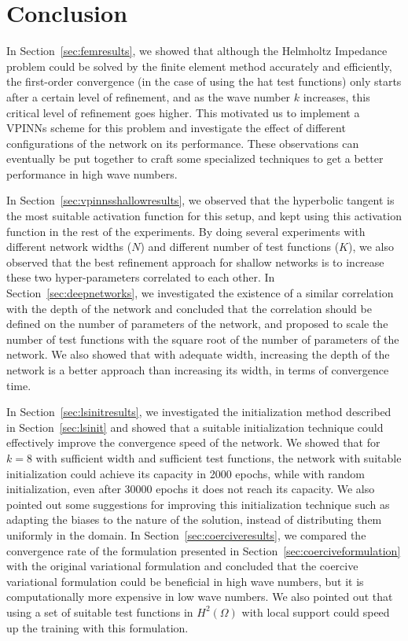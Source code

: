 \section{Conclusion}\label{sec:conclusion}
In Section~\ref{sec:femresults}, we showed that although the Helmholtz Impedance problem could be solved by the finite element method accurately and efficiently, the first-order convergence (in the case of using the hat test functions) only starts after a certain level of refinement, and as the wave number $k$ increases, this critical level of refinement goes higher. This motivated us to implement a VPINNs scheme for this problem and investigate the effect of different configurations of the network on its performance. These observations can eventually be put together to craft some specialized techniques to get a better performance in high wave numbers.

In Section~\ref{sec:vpinnsshallowresults}, we observed that the hyperbolic tangent is the most suitable activation function for this setup, and kept using this activation function in the rest of the experiments. By doing several experiments with different network widths ($N$) and different number of test functions ($K$), we also observed that the best refinement approach for shallow networks is to increase these two hyper-parameters correlated to each other. In Section~\ref{sec:deepnetworks}, we investigated the existence of a similar correlation with the depth of the network and concluded that the correlation should be defined on the number of parameters of the network, and proposed to scale the number of test functions with the square root of the number of parameters of the network. We also showed that with adequate width, increasing the depth of the network is a better approach than increasing its width, in terms of convergence time.

In Section~\ref{sec:lsinitresults}, we investigated the initialization method described in Section~\ref{sec:lsinit} and showed that a suitable initialization technique could effectively improve the convergence speed of the network. We showed that for $k=8$ with sufficient width and sufficient test functions, the network with suitable initialization could achieve its capacity in 2000 epochs, while with random initialization, even after 30000 epochs it does not reach its capacity. We also pointed out some suggestions for improving this initialization technique such as adapting the biases to the nature of the solution, instead of distributing them uniformly in the domain. In Section~\ref{sec:coerciveresults}, we compared the convergence rate of the formulation presented in Section~\ref{sec:coerciveformulation} with the original variational formulation and concluded that the coercive variational formulation could be beneficial in high wave numbers, but it is computationally more expensive in low wave numbers. We also pointed out that using a set of suitable test functions in $H^2(\Omega)$ with local support could speed up the training with this formulation.

